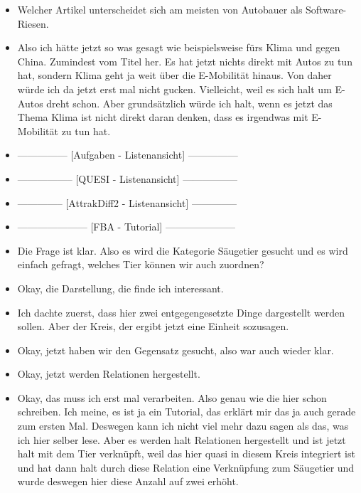 {\begin{itemize}[]
    Vielleicht aus dem Gefühl heraus \flqq Auto-Bloggerin nimmt Tesla-Modell auseinander\frqq{}. 
    Einfach, weil es da wahrscheinlich sehr viel um Software gehen wird und um den Autobauer an sich.
    \item {} Welcher Artikel unterscheidet sich am meisten von \flqq Autobauer als Software-Riesen\frqq{}.
    \item {} Also ich hätte jetzt so was gesagt wie beispielsweise \flqq fürs Klima und gegen China\frqq{}. 
    Zumindest vom Titel her.
    Es hat jetzt nichts direkt mit Autos zu tun hat, sondern Klima geht ja weit über die E-Mobilität hinaus.
    Von daher würde ich da jetzt erst mal nicht gucken. 
    Vielleicht, weil es sich halt um E-Autos dreht schon. 
    Aber grundsätzlich würde ich halt, wenn es jetzt das Thema Klima ist nicht direkt daran denken, dass es irgendwas mit E-Mobilität zu tun hat.
    \item {---------------} [Aufgaben - Listenansicht] {---------------}
    \item {-----------------} [QUESI - Listenansicht] {-----------------}
    \item {--------------} [AttrakDiff2 - Listenansicht] {--------------}
    \item {---------------------} [FBA - Tutorial] {---------------------}
    \item {} Die Frage ist klar. 
    Also es wird die Kategorie Säugetier gesucht und es wird einfach gefragt, welches Tier können wir auch zuordnen?
    \item {} Okay, die Darstellung, die finde ich interessant.
    \item {} Ich dachte zuerst, dass hier zwei entgegengesetzte Dinge dargestellt werden sollen. Aber der Kreis, der ergibt jetzt eine Einheit sozusagen.
    \item {} Okay, jetzt haben wir den Gegensatz gesucht, also war auch wieder klar.
    \item {} Okay, jetzt werden Relationen hergestellt.
    \item {} Okay, das muss ich erst mal verarbeiten.
    Also genau wie die hier schon schreiben.
    Ich meine, es ist ja ein Tutorial, das erklärt mir das ja auch gerade zum ersten Mal.
    Deswegen kann ich nicht viel mehr dazu sagen als das, was ich hier selber lese.
    Aber es werden halt Relationen hergestellt und ist jetzt halt mit dem Tier verknüpft, weil das hier quasi in diesem Kreis integriert ist und hat dann halt durch diese Relation eine Verknüpfung zum Säugetier und wurde deswegen hier diese Anzahl auf zwei erhöht.

\end{itemize}}
